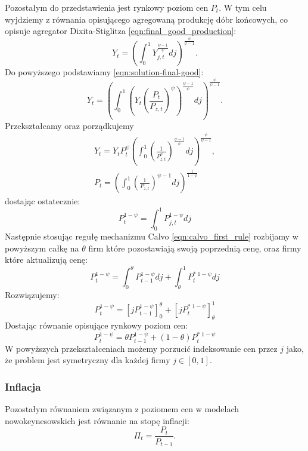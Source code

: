 Pozostałym do przedstawienia jest rynkowy poziom cen $P_{t}$. W tym celu wyjdziemy z równania opisującego agregowaną produkcję dóbr końcowych, co opisuje agregator Dixita-Stiglitza \eqref{eqn:final_good_production}:
\begin{equation}
    Y_t = \left(\int_0^1 Y_{j,t}^{\frac{\psi-1}{\psi}}dj\right)^{\frac{\psi}{\psi-1}}.
\end{equation}
Do powyższego podstawiamy \eqref{eqn:solution-final-good}:
\begin{equation}
    Y_t = \left(\int_0^1 \left(Y_t \left(\frac{P_t}{P_{z,t}}\right)^\psi \right)^{\frac{\psi-1}{\psi}}dj\right)^{\frac{\psi}{\psi-1}}.
\end{equation}
Przekształcamy oraz porządkujemy
\begin{gather}
    Y_t = Y_t P_t^\psi \left(\int_0^1 \left( \frac{1}{P_{z,t}^\psi} \right)^{\frac{\psi-1}{\psi}}dj\right)^{\frac{\psi}{\psi-1}}, \\
    P_t = \left(\int_0^1 \left( \frac{1}{P_{z,t}} \right)^{\psi-1}dj\right)^{\frac{1}{1-\psi}}
\end{gather}
dostając ostatecznie:
\begin{equation}
    P_t^{1-\psi} = \int_0^1 P_{j,t}^{1-\psi}dj
\end{equation}
Następnie stosując regułę mechanizmu Calvo \eqref{eqn:calvo_first_rule} rozbijamy w powyższym całkę na $\theta$ firm które pozostawiają swoją poprzednią cenę, oraz firmy które aktualizują cenę:
\begin{equation}
    P_t^{1-\psi} = \int_0^\theta P_{t-1}^{1-\psi}dj + \int_\theta^1 P_{t}^{*\;1-\psi}dj
\end{equation}
Rozwiązujemy:
\begin{equation}
    P_t^{1-\psi} = \left[j P_{t-1}^{1-\psi}\right]_0^\theta + \left[j P_{t}^{*\;1-\psi}\right]_\theta^1
\end{equation}
Dostając równanie opisujące rynkowy poziom cen:
\begin{equation}
    P_t^{1-\psi} = \theta P_{t-1}^{1-\psi} + (1-\theta) P_{t}^{*\;1-\psi}
\end{equation}
W powyższych przekształceniach możemy porzucić indeksowanie cen przez $j$ jako, że problem jest symetryczny dla każdej firmy $j \in [0,1]$.

\subsubsection{Inflacja}
Pozostałym równaniem związanym z poziomem cen w modelach nowokeynesowskich jest równanie na stopę inflacji:
\begin{equation}
    \Pi_t = \frac{P_t}{P_{t-1}}.
\end{equation}

